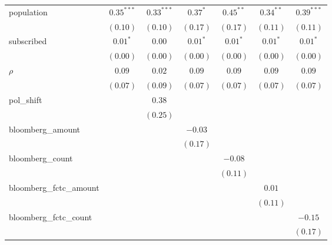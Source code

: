 \begin{table}[!h]
\begin{center}
\begin{tabular}{l c c c c c c }
population              & $0.35^{***}$  & $0.33^{***}$ & $0.37^{*}$    & $0.45^{**}$   & $0.34^{**}$   & $0.39^{***}$  \\
                        & $(0.10)$      & $(0.10)$     & $(0.17)$      & $(0.17)$      & $(0.11)$      & $(0.11)$      \\
subscribed              & $0.01^{*}$    & $0.00$       & $0.01^{*}$    & $0.01^{*}$    & $0.01^{*}$    & $0.01^{*}$    \\
                        & $(0.00)$      & $(0.00)$     & $(0.00)$      & $(0.00)$      & $(0.00)$      & $(0.00)$      \\
$\rho$                  & $0.09$        & $0.02$       & $0.09$        & $0.09$        & $0.09$        & $0.09$        \\
                        & $(0.07)$      & $(0.09)$     & $(0.07)$      & $(0.07)$      & $(0.07)$      & $(0.07)$      \\
pol\_shift              &               & $0.38$       &               &               &               &               \\
                        &               & $(0.25)$     &               &               &               &               \\
bloomberg\_amount       &               &              & $-0.03$       &               &               &               \\
                        &               &              & $(0.17)$      &               &               &               \\
bloomberg\_count        &               &              &               & $-0.08$       &               &               \\
                        &               &              &               & $(0.11)$      &               &               \\
bloomberg\_fctc\_amount &               &              &               &               & $0.01$        &               \\
                        &               &              &               &               & $(0.11)$      &               \\
bloomberg\_fctc\_count  &               &              &               &               &               & $-0.15$       \\
                        &               &              &               &               &               & $(0.17)$      \\
\midrule

\end{tabular}
\end{center}
\end{table}
